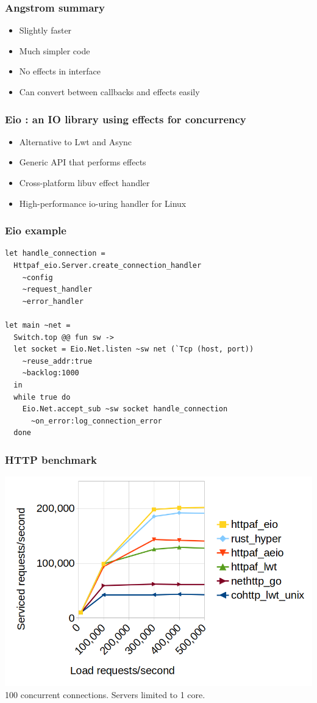 \documentclass{beamer}
\begin{document}
\begin{frame}
	\frametitle{Angstrom summary}
	\begin{itemize}
		\item Slightly faster
		\item Much simpler code
		\item No effects in interface
		\item Can convert between callbacks and effects easily
	\end{itemize}
\end{frame}

\begin{frame}
	\frametitle{Eio : an IO library using effects for concurrency}
	\begin{itemize}
		\item Alternative to Lwt and Async
		\item Generic API that performs effects
		\item Cross-platform libuv effect handler
		\item High-performance io-uring handler for Linux
	\end{itemize}
\end{frame}

\begin{frame}[fragile]
	\frametitle{Eio example}
\begin{lstlisting}[style=ocaml]
let handle_connection =
  Httpaf_eio.Server.create_connection_handler
    ~config
    ~request_handler
    ~error_handler

let main ~net =
  Switch.top @@ fun sw ->
  let socket = Eio.Net.listen ~sw net (`Tcp (host, port))
    ~reuse_addr:true
    ~backlog:1000 
  in
  while true do
    Eio.Net.accept_sub ~sw socket handle_connection
      ~on_error:log_connection_error 
  done
\end{lstlisting}
\end{frame}

\begin{frame}
	\frametitle{HTTP benchmark}
	\includegraphics[width=\textwidth]{rps-graph.png}
	100 concurrent connections. Servers limited to 1 core.
\end{frame}
\end{document}
